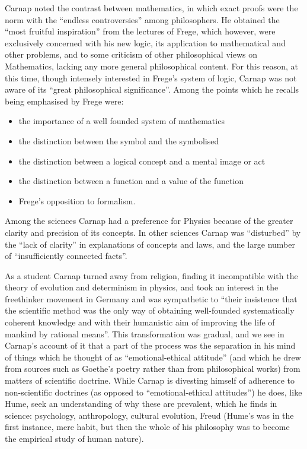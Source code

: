 \documentclass[10pt,titlepage]{book}
\begin{document}
Carnap noted the contrast between mathematics, in which exact proofs were the norm with the ``endless controversies'' among philosophers. 
He obtained the ``most fruitful inspiration'' from the lectures of Frege, which however, were exclusively concerned with his new logic, its application to mathematical and other problems, and to some criticism of other philosophical views on Mathematics, lacking any more general philosophical content.
For this reason, at this time, though intensely interested in Frege's system of logic, Carnap was not aware of its ``great philosophical significance''.
Among the points which he recalls being emphasised by Frege were:
\begin{itemize}
\item the importance of a well founded system of mathematics
\item the distinction between the symbol and the symbolised
\item the distinction between a logical concept and a mental image or act
\item the distinction between a function and a value of the function
\item Frege's opposition to formalism.
\end{itemize}

Among the sciences Carnap had a preference for Physics because of the greater clarity and precision of its concepts.
In other sciences Carnap was ``disturbed'' by the ``lack of clarity'' in explanations of concepts and laws, and the large number of ``insufficiently connected facts''.

As a student Carnap turned away from religion, finding it incompatible with the theory of evolution and determinism in physics, and took an interest in the freethinker movement in Germany and was sympathetic to ``their insistence that the scientific method was the only way of obtaining well-founded systematically coherent knowledge and with their humanistic aim of improving the life of mankind by rational means''.
This transformation was gradual, and we see in Carnap's account of it that a part of the process was the separation in his mind of things which he thought of as ``emotional-ethical attitude'' (and which he drew from sources such as Goethe's poetry rather than from philosophical works) from matters of scientific doctrine.
While Carnap is divesting himself of adherence to non-scientific doctrines (as opposed to ``emotional-ethical attitudes'') he does, like Hume, seek an understanding of why these are prevalent, which he finds in science: psychology, anthropology, cultural evolution, Freud (Hume's was in the first instance, mere habit, but then the whole of his philosophy was to become the empirical study of human nature).
\end{document}
